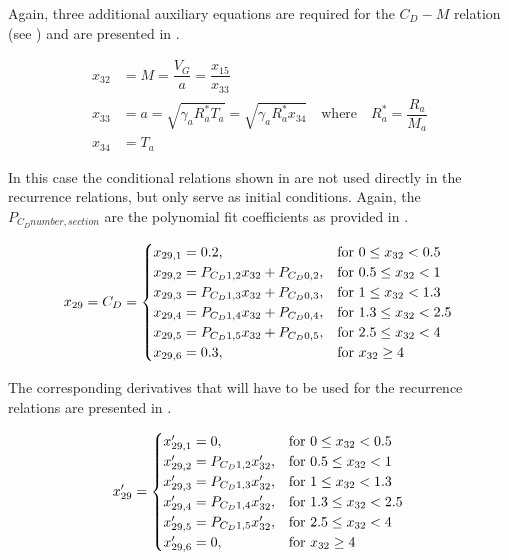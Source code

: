 \noindent
Again, three additional auxiliary equations are required for the $C_{D}-M$ relation (see ) and are presented in .

 \begin{equation} \label{eq:cdAux}
\begin{split}
x_{32} &= M = \dfrac{V_{G}}{a} = \dfrac{x_{15}}{x_{33}}\\
x_{33} &= a = \sqrt{\gamma_{a}R_{a}^{*}T_{a}} = \sqrt{\gamma_{a}R_{a}^{*}x_{34}} \quad \text{where} \quad R_{a}^{*}=\dfrac{R_{a}}{M_{a}} \\
x_{34} &= T_{a}
\end{split}
\end{equation}

\noindent
In this case the conditional relations shown in  are not used directly in the recurrence relations, but only serve as initial conditions. Again, the $P_{C_{D} number,section}$ are the polynomial fit coefficients as provided in .

\begin{equation}\label{eq:cdCond}
x_{29}=C_{D}=\begin{cases}
x_{29,1}=0.2, & \text{for } 0\leq x_{32} < 0.5\\
x_{29,2}=P_{C_{D} 1,2}x_{32}+P_{C_{D} 0,2}, &  \text{for } 0.5\leq x_{32} < 1 \\
x_{29,3}=P_{C_{D} 1,3}x_{32}+P_{C_{D} 0,3}, &  \text{for } 1\leq x_{32} < 1.3 \\
x_{29,4}=P_{C_{D} 1,4}x_{32}+P_{C_{D} 0,4}, &  \text{for } 1.3\leq x_{32} < 2.5 \\
x_{29,5}=P_{C_{D} 1,5}x_{32}+P_{C_{D} 0,5}, &  \text{for } 2.5\leq x_{32} < 4 \\
x_{29,6}=0.3, &  \text{for } x_{32} \geq 4 
\end{cases}\\
\end{equation}

\noindent
The corresponding derivatives that will have to be used for the recurrence relations are presented in .

\begin{equation}\label{eq:cdCondDer}
x'_{29}=\begin{cases}
x'_{29,1}=0, & \text{for } 0\leq x_{32} < 0.5\\
x'_{29,2}=P_{C_{D} 1,2}x'_{32}, &  \text{for } 0.5\leq x_{32} < 1 \\
x'_{29,3}=P_{C_{D} 1,3}x'_{32}, &  \text{for } 1\leq x_{32} < 1.3 \\
x'_{29,4}=P_{C_{D} 1,4}x'_{32}, &  \text{for } 1.3\leq x_{32} < 2.5 \\
x'_{29,5}=P_{C_{D} 1,5}x'_{32}, &  \text{for } 2.5\leq x_{32} < 4 \\
x'_{29,6}=0, &  \text{for } x_{32} \geq 4 
\end{cases}\\
\end{equation}

